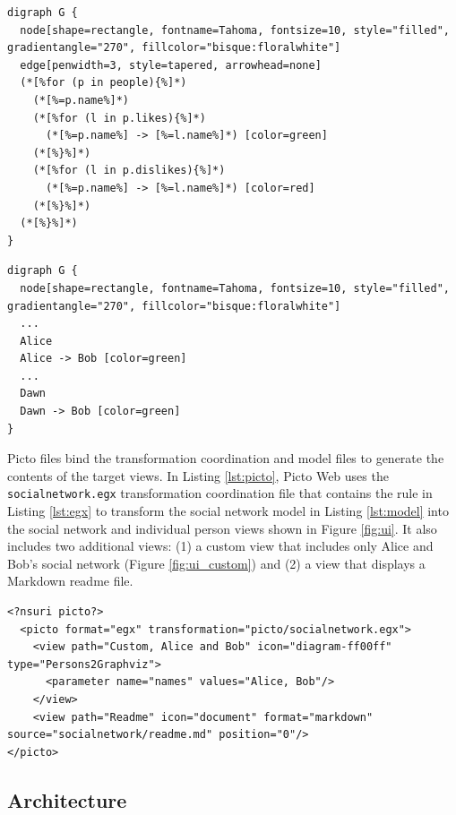 \documentclass[sigconf,review]{acmart}
\begin{document}
\begin{lstlisting}[firstnumber=1,style=egx,caption={An EGL template that generates a Graphviz representation of a social network.},label=lst:egl]
digraph G {
  node[shape=rectangle, fontname=Tahoma, fontsize=10, style="filled", gradientangle="270", fillcolor="bisque:floralwhite"]
  edge[penwidth=3, style=tapered, arrowhead=none]
  (*[%for (p in people){%]*)
    (*[%=p.name%]*)
    (*[%for (l in p.likes){%]*)
      (*[%=p.name%] -> [%=l.name%]*) [color=green]
    (*[%}%]*)
    (*[%for (l in p.dislikes){%]*)
      (*[%=p.name%] -> [%=l.name%]*) [color=red]
    (*[%}%]*)
  (*[%}%]*)
}
\end{lstlisting}

\begin{lstlisting}[firstnumber=1,style=egx,caption={A view generated by the EGL template in Listing \ref{lst:egl}.},label=lst:output]
digraph G {
  node[shape=rectangle, fontname=Tahoma, fontsize=10, style="filled", gradientangle="270", fillcolor="bisque:floralwhite"]
  ...
  Alice
  Alice -> Bob [color=green]
  ...
  Dawn
  Dawn -> Bob [color=green] 
}
\end{lstlisting}

Picto files bind the transformation coordination and model files to generate the contents of the target views. In Listing \ref{lst:picto}, Picto Web uses the \texttt{socialnetwork.egx} transformation coordination file that contains the rule in Listing \ref{lst:egx} to transform the social network model in Listing \ref{lst:model} into the social network and individual person views shown in Figure \ref{fig:ui}. It also includes two additional views: (1) a custom view that includes only Alice and Bob's social network (Figure \ref{fig:ui_custom}) and (2) a view that displays a Markdown readme file.

\begin{lstlisting}[firstnumber=1,style=picto,caption={The Picto file that binds the model and the visualisation transformation.},label=lst:picto]
<?nsuri picto?>
  <picto format="egx" transformation="picto/socialnetwork.egx">
    <view path="Custom, Alice and Bob" icon="diagram-ff00ff" type="Persons2Graphviz">
      <parameter name="names" values="Alice, Bob"/>
    </view>        
    <view path="Readme" icon="document" format="markdown" source="socialnetwork/readme.md" position="0"/>
</picto>
\end{lstlisting}


\subsection{Architecture}
\label{sec:architecture}
\end{document}
